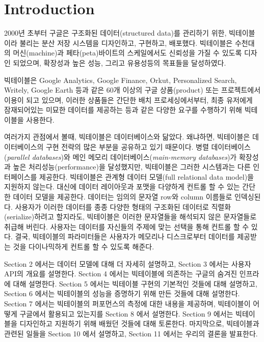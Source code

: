 \documentclass[twocolumn]{article}
\begin{document}
\section{Introduction}

2000년 초부터 구글은 구조화된 데이터(structured data)를 관리하기 위한, 빅테이블이라 불리는 분산 저장 시스템을 디자인하고, 구현하고, 배포했다.
빅테이블은 수천대의 머신(machine)과 페타(peta)바이트의 스케일에서도 신뢰성을 가질 수 있도록 디자인 되었으며, 확장성과 높은 성능, 그리고 유용성등의 목표들을 달성하였다.

빅테이블은 Google Analytics, Google Finance, Orkut, Personalized Search, Writely, Google Earth 등과 같은 60개 이상의 구글 상품(product) 또는 프로젝트에서 이용이 되고 있으며, 이러한 상품들은 간단한 배치 프로세싱에서부터, 최종 유저에게 잠재되어있는 미묘한 데이터를 제공하는 등과 같은 다양한 요구를 수행하기 위해 빅테이블을 사용한다.
 
 여러가지 관점에서 볼때,  빅테이블은 데이터베이스와 닮았다. 왜냐하면, 빅테이블은 데이터베이스의 구현 전략의 많은 부분을 공유하고 있기 때문이다.
 병렬 데이터베이스(\textit{parallel databases})와 메인 메모리 데이터베이스(\textit{main-memory databases})가 확장성과 높은 처리성능(performance)을 달성했지만, 빅테이블은 그러한 시스템과는 다른 인터페이스를 제공한다. 빅테이블은 관계형 데이터 모델(full relational data model)을 지원하지 않는다. 대신에 데이터 레이아웃과 포맷을 다양하게 컨트롤 할 수 있는 간단한 데이터 모델을 제공한다.
데이터는 임의의 문자열 row와 column 이름들로 인덱싱된다. 사용자가 이러한 데이터를 종종 다양한 형태의 구조화된 데이터로 직렬화(serialize)하려고 할지라도, 빅테이블은 이러한 문자열들을 해석되지 않은 문자열들로 취급해 버린다. 사용자는 데이터를 자신들의 주제에 맞는 선택을 통해 컨트롤 할 수 있다. 결국, 빅테이블의 파라미터들은 사용자가 메모리나 디스크로부터 데이터를 제공받는 것을 다이나믹하게 컨트롤 할 수 있도록 해준다.
 
 Section 2 에서는 데이터 모델에 대해 더 자세히 설명하고, Section 3 에서는 사용자 API의 개요를 설명한다. Section 4 에서는 빅테이블에 의존하는 구글의 숨겨진 인프라에 대해 설명한다. Section 5 에서는 빅테이블 구현의 기본적인 것들에 대해 설명하고, Section 6 에서는 빅테이블의 성능을 증명하기 위해 만든 것들에 대해 설명한다. Section 7 에서는 빅테이블의 퍼포먼스의 측정에 대한 내용을 제공하며, 빅테이블이 어떻게 구글에서 활용되고 있는지를 Section 8 에서 설명한다. Section 9 에서는 빅테이블을 디자인하고 지원하기 위해 배웠던 것들에 대해 토론한다. 마지막으로, 빅테이블과 관련된 일들을 Section 10 에서 설명하고, Section 11 에서는 우리의 결론을 발표한다.
\end{document}
